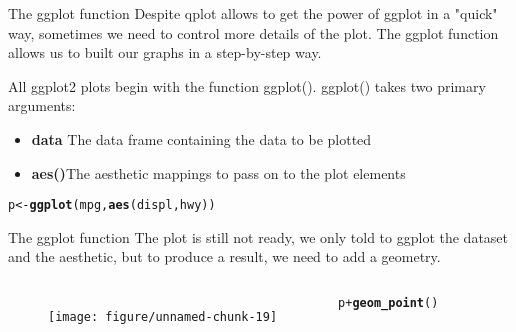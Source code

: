 \documentclass{beamer}\usepackage[]{graphicx}\usepackage[]{color}
\makeatletter
\def\maxwidth{ %
  \ifdim\Gin@nat@width>\linewidth
    \linewidth
  \else
    \Gin@nat@width
  \fi
}
\newcommand{\hlopt}[1]{\textcolor[rgb]{0,0,0}{#1}}%
\newcommand{\hlstd}[1]{\textcolor[rgb]{0.345,0.345,0.345}{#1}}%
\newcommand{\hlkwb}[1]{\textcolor[rgb]{0.69,0.353,0.396}{#1}}%
\newcommand{\hlkwd}[1]{\textcolor[rgb]{0.737,0.353,0.396}{\textbf{#1}}}%
\newenvironment{kframe}{%
 \def\at@end@of@kframe{}%
 \ifinner\ifhmode%
  \def\at@end@of@kframe{\end{minipage}}%
  \begin{minipage}{\columnwidth}%
 \fi\fi%
 \def\FrameCommand##1{\hskip\@totalleftmargin \hskip-\fboxsep
 \colorbox{shadecolor}{##1}\hskip-\fboxsep
     \hskip-\linewidth \hskip-\@totalleftmargin \hskip\columnwidth}%
 \MakeFramed {\advance\hsize-\width
   \@totalleftmargin\z@ \linewidth\hsize
   \@setminipage}}%
 {\par\unskip\endMakeFramed%
 \at@end@of@kframe}
\newenvironment{knitrout}{}{} %
\makeatother
\begin{document}
\begin{frame}[containsverbatim]{The ggplot function}
Despite qplot allows to get the power of ggplot in a "quick" way, sometimes we need to control more details of the plot. The ggplot function allows us to built our graphs in a step-by-step way.


All ggplot2 plots begin with the function ggplot(). ggplot() takes two primary arguments:
\begin{itemize}
\item \textbf{data} The data frame containing the data to be plotted
\item \textbf{aes()}The aesthetic mappings to pass on to the plot elements
\end{itemize}
\begin{knitrout}\footnotesize
{}\color{fgcolor}\begin{kframe}
\begin{alltt}
\hlstd{p} \hlkwb{<-} \hlkwd{ggplot}\hlstd{(mpg,} \hlkwd{aes}\hlstd{(displ, hwy))}
\end{alltt}
\end{kframe}
\end{knitrout}
\end{frame}

\begin{frame}[containsverbatim]{The ggplot function}
The plot is still not ready, we only told to ggplot the dataset and the aesthetic, but to produce a result, we need to add a geometry.
\begin{columns}[t] 
\begin{minipage}{1\textwidth}
\begin{figure}[t]
\centering
\begin{knitrout}\footnotesize
{}\color{fgcolor}
\texttt{[image: figure/unnamed-chunk-19]} 

\end{knitrout}
\end{figure}
 \end{minipage}
\begin{minipage}{1\textwidth}
\begin{knitrout}\footnotesize
{}\color{fgcolor}\begin{kframe}
\begin{alltt}
\hlstd{p} \hlopt{+} \hlkwd{geom_point}\hlstd{()}
\end{alltt}
\end{kframe}
\end{knitrout}
\end{minipage}
\end{columns}
\end{frame}
\end{document}
